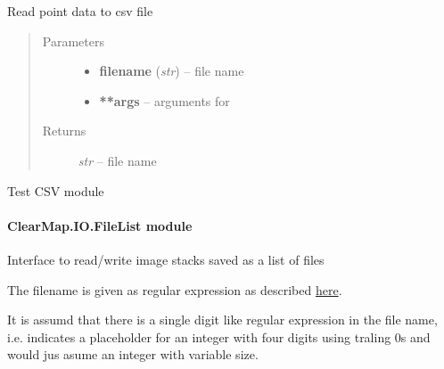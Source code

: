 \documentclass[letterpaper,10pt,english]{sphinxmanual}
\begin{document}

\begin{fulllineitems}
\label{api/ClearMap.IO:ClearMap.IO.CSV.readPoints}
Read point data to csv file
\begin{quote}\begin{description}
\item[{Parameters}] \leavevmode\begin{itemize}
\item {} 
\textbf{filename} (\emph{str}) --
file name

\item {} 
\textbf{**args} --
arguments for 

\end{itemize}

\item[{Returns}] \leavevmode
\emph{str} --
file name

\end{description}\end{quote}

\end{fulllineitems}


\begin{fulllineitems}
\label{api/ClearMap.IO:ClearMap.IO.CSV.test}
Test CSV module

\end{fulllineitems}



\paragraph{ClearMap.IO.FileList module}
\label{api/ClearMap.IO:module-ClearMap.IO.FileList}\label{api/ClearMap.IO:clearmap-io-filelist-module}
Interface to read/write image stacks saved as a list of files

The filename is given as regular expression as described
\href{https://docs.python.org/2/library/re.html}{here}.

It is assumd that there is a single digit like regular expression in the file
name, i.e.  indicates a placeholder for an integer with four digits using traling 0s
and  would jus asume an integer with variable size.
\end{document}
